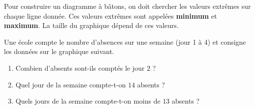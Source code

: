 \begin{pageCours}
\begin{Ex}
\begin{center}
\begin{tikzpicture}
\end{tikzpicture}
\end{center}
\end{Ex}

\begin{Mt} 

Pour construire un diagramme à bâtons, on doit chercher les valeurs  extrêmes sur chaque ligne donnée. Ces  valeurs  extrêmes sont appelées \textbf{minimum} et \textbf{maximum}. La taille du graphique dépend de ces valeurs.

\end{Mt}

\end{pageCours}

\begin{pageAD} 



Une école compte le nombre d'absences sur une semaine (jour 1 à 4) et consigne les données sur le graphique suivant.

\begin{minipage}{0.5\linewidth}


\end{minipage}
\begin{minipage}{0.5\linewidth}

\begin{enumerate}
\item Combien d'absents sont-ils comptés le jour $2$ ? 
\item Quel jour de la semaine compte-t-on $14$ absents ?  
\item Quels jours de la semaine compte-t-on moins de $13$ absents ?  
\end{enumerate}
\end{minipage}



\end{pageAD}
